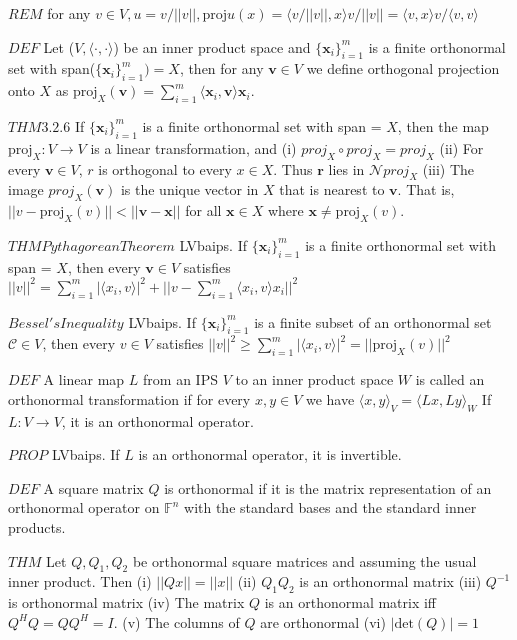 \documentclass[8pt]{extarticle}
\theoremstyle{definition}
\begin{document}
{$REM$ for any $v \in  V, u = v / ||v||, \text{proj}u(x) = \langle v / ||v||,x \rangle v/||v|| = \langle v,x \rangle v / \langle v,v \rangle$

$DEF$ Let ($V, \langle \cdot,\cdot \rangle$) be an inner product space and $\{\mathbf{x}_i\}_{i=1}^m$ is a finite orthonormal set with span($\{\mathbf{x}_i\}_{i=1}^m) = X$, then for any $\mathbf{v} \in V$ we define orthogonal projection onto $X$ as $\text{proj}_X(\mathbf{v}) = \sum^{m}_{i=1} \langle \mathbf{x}_i,\mathbf{v} \rangle \mathbf{x}_i$.

$THM 3.2.6$ If $\{\mathbf{x}_i\}_{i=1}^m$ is a finite orthonormal set with span = $X$, then the map $\text{proj}_X: V \to V$ is a linear transformation, and (i) $proj_X \circ proj_X = proj_X$
(ii) For every $\mathbf{v} \in V$, $r$ is orthogonal to every $x \in X$. Thus $\mathbf{r}$ lies in $\mathscr{N}proj_X$
(iii) The image $proj_X(\mathbf{v})$ is the unique vector in $X$ that is nearest to $\mathbf{v}$. That is, $||v - \text{proj}_X(v) || < ||\mathbf{v} - \mathbf{x}||$ for all $\mathbf{x} \in X$ where $\mathbf{x} \neq \text{proj}_X(v)$.

$THMPythagorean Theorem$ LVbaips. If $\{\mathbf{x}_i\}_{i=1}^m$ is a finite orthonormal set with span = $X$, then every $\mathbf{v} \in V$ satisfies $||v||^2 = \sum^{m}_{i=1} |\langle x_i,v \rangle|^2 + ||v - \sum^{m}_{i=1} \langle x_i,v \rangle x_i||^2  $

$Bessel's Inequality$ LVbaips. If $\{\mathbf{x}_i\}_{i=1}^m$ is a finite subset of an orthonormal set $\mathscr{C} \in V$, then every $v \in V$ satisfies $||v||^2 \geq \sum^{m}_{i=1} | \langle x_i,v \rangle|^2 = ||\text{proj}_X(v)||^2$

$DEF$ A linear map $L$ from an IPS $V$ to an inner product space $W$ is called an orthonormal transformation if for every $x,y \in V$ we have $\langle x,y \rangle_V = \langle Lx,Ly \rangle_W$ If $L: V \to V$, it is an orthonormal operator. 

$PROP$ LVbaips. If $L$ is an orthonormal operator, it is invertible. 

$DEF$ A square matrix $Q$ is orthonormal if it is the matrix representation of an orthonormal operator on $\mathbb{F}^n$ with the standard bases and the standard inner products.


$THM$ Let $Q, Q_1, Q_2$ be orthonormal square matrices and assuming the usual inner product. Then 
(i) $||Qx|| = ||x||$
(ii) $Q_1Q_2$ is an orthonormal matrix
(iii) $Q^{-1}$ is orthonormal matrix
(iv) The matrix $Q$ is an orthonormal matrix iff $Q^HQ = QQ^H = I$.
(v) The columns of $Q$ are orthonormal 
(vi) $|\text{det}(Q)| = 1$

}
\end{document}
